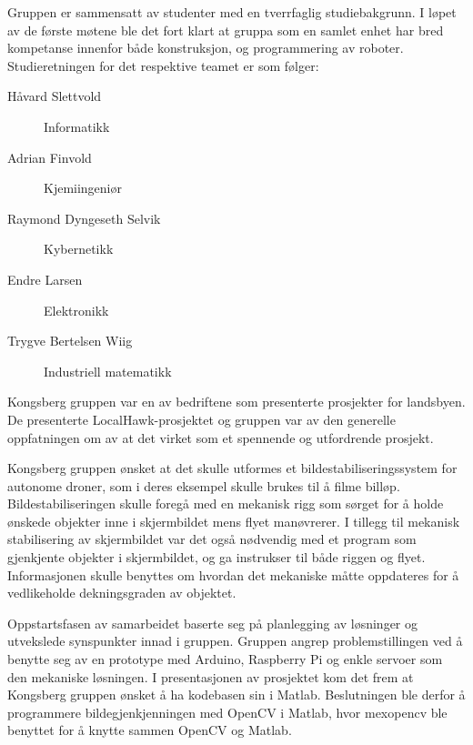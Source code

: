 Gruppen er sammensatt av studenter med en tverrfaglig studiebakgrunn. I løpet av de første møtene ble det fort klart at gruppa som en samlet enhet har bred kompetanse innenfor både konstruksjon, og programmering av roboter. Studieretningen for det respektive teamet er som følger:
%
\begin{description}
	\item[Håvard Slettvold] Informatikk
	\item[Adrian Finvold] Kjemiingeniør
	\item[Raymond Dyngeseth Selvik] Kybernetikk
	\item[Endre Larsen] Elektronikk
	\item[Trygve Bertelsen Wiig] Industriell matematikk
\end{description}
%
Kongsberg gruppen var en av bedriftene som presenterte prosjekter for landsbyen. De presenterte LocalHawk-prosjektet og gruppen var av den generelle oppfatningen om av at det virket som et spennende og utfordrende prosjekt. 

Kongsberg gruppen ønsket at det skulle utformes et bildestabiliseringssystem for autonome droner, som i deres eksempel skulle brukes til å filme billøp. Bildestabiliseringen skulle foregå med en mekanisk rigg som sørget for å holde ønskede objekter inne i skjermbildet mens flyet manøvrerer. I tillegg til mekanisk stabilisering av skjermbildet var det også nødvendig med et program som gjenkjente objekter i skjermbildet, og ga instrukser til både riggen og flyet. Informasjonen skulle benyttes om hvordan det mekaniske måtte oppdateres for å vedlikeholde dekningsgraden av objektet. 

Oppstartsfasen av samarbeidet baserte seg på planlegging av løsninger og utvekslede synspunkter innad i gruppen. Gruppen angrep problemstillingen ved å benytte seg av en prototype med Arduino, Raspberry Pi og enkle servoer som den mekaniske løsningen. I presentasjonen av prosjektet kom det frem at Kongsberg gruppen ønsket å ha kodebasen sin i Matlab. Beslutningen ble derfor å programmere bildegjenkjenningen med OpenCV i Matlab, hvor mexopencv ble benyttet for å knytte sammen OpenCV og Matlab.